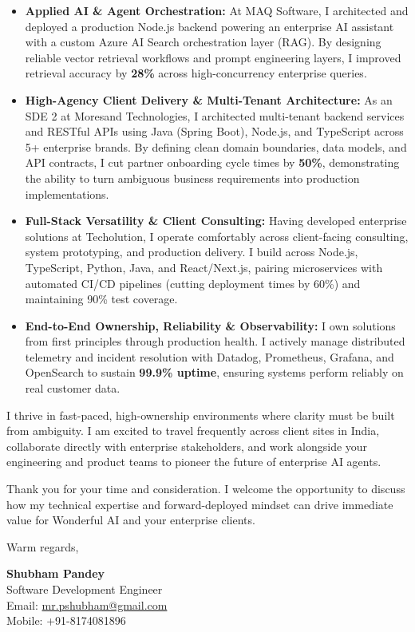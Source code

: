 \documentclass[a4paper,10pt]{article}
\begin{document}
\begin{itemize}[leftmargin=12pt, itemsep=3pt, parsep=0pt]
  \item \textbf{Applied AI \& Agent Orchestration:} At MAQ Software, I architected and deployed a production Node.js backend powering an enterprise AI assistant with a custom Azure AI Search orchestration layer (RAG). By designing reliable vector retrieval workflows and prompt engineering layers, I improved retrieval accuracy by \textbf{28\%} across high-concurrency enterprise queries.
  \item \textbf{High-Agency Client Delivery \& Multi-Tenant Architecture:} As an SDE 2 at Moresand Technologies, I architected multi-tenant backend services and RESTful APIs using Java (Spring Boot), Node.js, and TypeScript across 5+ enterprise brands. By defining clean domain boundaries, data models, and API contracts, I cut partner onboarding cycle times by \textbf{50\%}, demonstrating the ability to turn ambiguous business requirements into production implementations.
  \item \textbf{Full-Stack Versatility \& Client Consulting:} Having developed enterprise solutions at Techolution, I operate comfortably across client-facing consulting, system prototyping, and production delivery. I build across Node.js, TypeScript, Python, Java, and React/Next.js, pairing microservices with automated CI/CD pipelines (cutting deployment times by 60\%) and maintaining 90\% test coverage.
  \item \textbf{End-to-End Ownership, Reliability \& Observability:} I own solutions from first principles through production health. I actively manage distributed telemetry and incident resolution with Datadog, Prometheus, Grafana, and OpenSearch to sustain \textbf{99.9\% uptime}, ensuring systems perform reliably on real customer data.
\end{itemize}

\vspace{6pt}
I thrive in fast-paced, high-ownership environments where clarity must be built from ambiguity. I am excited to travel frequently across client sites in India, collaborate directly with enterprise stakeholders, and work alongside your engineering and product teams to pioneer the future of enterprise AI agents.

\vspace{6pt}
Thank you for your time and consideration. I welcome the opportunity to discuss how my technical expertise and forward-deployed mindset can drive immediate value for Wonderful AI and your enterprise clients.

\vspace{12pt}
Warm regards,

\vspace{6pt}
\textbf{Shubham Pandey} \\
Software Development Engineer \\
Email: \href{mailto:mr.pshubham@gmail.com}{mr.pshubham@gmail.com} \\
Mobile: +91-8174081896
\end{document}
